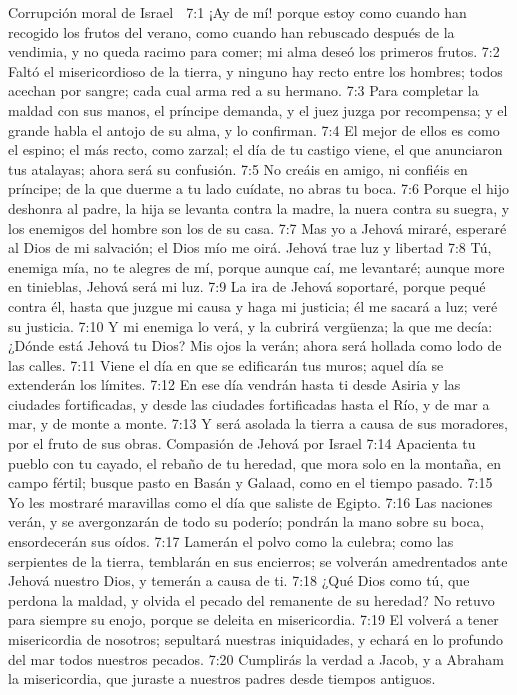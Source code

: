 Corrupción moral de Israel  

7:1 ¡Ay de mí! porque estoy como cuando han recogido los frutos del verano, como cuando han rebuscado después de la vendimia, y no queda racimo para comer; mi alma deseó los primeros frutos.  
7:2 Faltó el misericordioso de la tierra, y ninguno hay recto entre los hombres; todos acechan por sangre; cada cual arma red a su hermano.  
7:3 Para completar la maldad con sus manos, el príncipe demanda, y el juez juzga por recompensa; y el grande habla el antojo de su alma, y lo confirman.  
7:4 El mejor de ellos es como el espino; el más recto, como zarzal; el día de tu castigo viene, el que anunciaron tus atalayas; ahora será su confusión.  
7:5 No creáis en amigo, ni confiéis en príncipe; de la que duerme a tu lado cuídate, no abras tu boca.  
7:6 Porque el hijo deshonra al padre, la hija se levanta contra la madre, la nuera contra su suegra, y los enemigos del hombre son los de su casa. 
7:7 Mas yo a Jehová miraré, esperaré al Dios de mi salvación; el Dios mío me oirá.  
Jehová trae luz y libertad  
7:8 Tú, enemiga mía, no te alegres de mí, porque aunque caí, me levantaré; aunque more en tinieblas, Jehová será mi luz.  
7:9 La ira de Jehová soportaré, porque pequé contra él, hasta que juzgue mi causa y haga mi justicia; él me sacará a luz; veré su justicia.  
7:10 Y mi enemiga lo verá, y la cubrirá vergüenza; la que me decía: ¿Dónde está Jehová tu Dios? Mis ojos la verán; ahora será hollada como lodo de las calles.  
7:11 Viene el día en que se edificarán tus muros; aquel día se extenderán los límites.  
7:12 En ese día vendrán hasta ti desde Asiria y las ciudades fortificadas, y desde las ciudades fortificadas hasta el Río, y de mar a mar, y de monte a monte.  
7:13 Y será asolada la tierra a causa de sus moradores, por el fruto de sus obras.  
Compasión de Jehová por Israel  
7:14 Apacienta tu pueblo con tu cayado, el rebaño de tu heredad, que mora solo en la montaña, en campo fértil; busque pasto en Basán y Galaad, como en el tiempo pasado.  
7:15 Yo les mostraré maravillas como el día que saliste de Egipto.  
7:16 Las naciones verán, y se avergonzarán de todo su poderío; pondrán la mano sobre su boca, ensordecerán sus oídos.  
7:17 Lamerán el polvo como la culebra; como las serpientes de la tierra, temblarán en sus encierros; se volverán amedrentados ante Jehová nuestro Dios, y temerán a causa de ti.  
7:18 ¿Qué Dios como tú, que perdona la maldad, y olvida el pecado del remanente de su heredad? No retuvo para siempre su enojo, porque se deleita en misericordia.  
7:19 El volverá a tener misericordia de nosotros; sepultará nuestras iniquidades, y echará en lo profundo del mar todos nuestros pecados.  
7:20 Cumplirás la verdad a Jacob, y a Abraham la misericordia, que juraste a nuestros padres desde tiempos antiguos.


